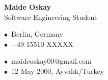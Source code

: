 \documentclass[10pt,a4paper]{article}
\begin{document}
\noindent
\colorbox{lightbg}{%
  \begin{minipage}{\dimexpr\linewidth-2\fboxsep\relax}
  \vspace{18pt}
  \begin{minipage}[c]{0.98\linewidth}
    {\Huge\bfseries\color{brandbrown} Maide Oskay}\\[6pt]
    {\large\color{textmuted} Software Engineering Student}\\[10pt]
    \small
    \begin{minipage}[t]{0.48\linewidth}\raggedright
      $\bullet$~Berlin, Germany\\[4pt]
      $\bullet$~+49 15510 XXXXX
    \end{minipage}%
    \begin{minipage}[t]{0.5\linewidth}\raggedright
      $\bullet$~maideoskay00@gmail.com\\[4pt]
      $\bullet$~12 May 2000, Ayvalık/Turkey
    \end{minipage}
  \end{minipage}
  \vspace{18pt}
  \end{minipage}%
}

\vspace{18pt}
\end{document}
